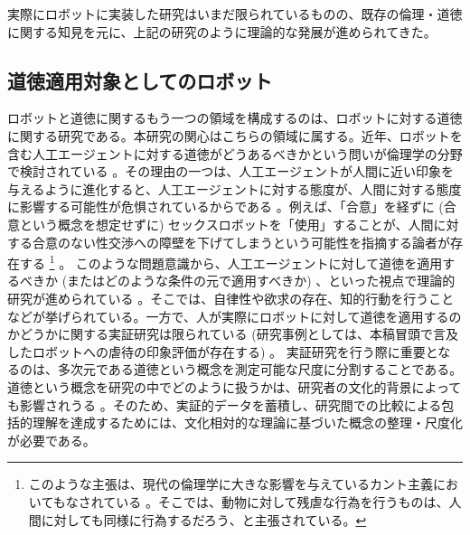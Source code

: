 \documentclass[a4j,12pt]{jreport}
\begin{document}
実際にロボットに実装した研究はいまだ限られているものの、既存の倫理・道徳に関する知見を元に、上記の研究のように理論的な発展が進められてきた。

\subsection{道徳適用対象としてのロボット}
ロボットと道徳に関するもう一つの領域を構成するのは、ロボットに対する道徳に関する研究である。本研究の関心はこちらの領域に属する。近年、ロボットを含む人工エージェントに対する道徳がどうあるべきかという問いが倫理学の分野で検討されている\cite{coeck, sex} 。その理由の一つは、人工エージェントが人間に近い印象を与えるように進化すると、人工エージェントに対する態度が、人間に対する態度に影響する可能性が危惧されているからである\cite{sex, Darling} 。例えば、「合意」を経ずに (合意という概念を想定せずに) セックスロボットを「使用」することが、人間に対する合意のない性交渉への障壁を下げてしまうという可能性を指摘する論者が存在する\cite{sex} \footnote{このような主張は、現代の倫理学に大きな影響を与えているカント主義においてもなされている\cite{Kant} 。そこでは、動物に対して残虐な行為を行うものは、人間に対しても同様に行為するだろう、と主張されている。} 。
このような問題意識から、人工エージェントに対して道徳を適用するべきか (またはどのような条件の元で適用すべきか) 、といった視点で理論的研究が進められている\cite{when} 。そこでは、自律性や欲求の存在、知的行動を行うことなどが挙げられている。一方で、人が実際にロボットに対して道徳を適用するのかどうかに関する実証研究は限られている (研究事例としては、本稿冒頭で言及したロボットへの虐待の印象評価\cite{abuse}が存在する) 。
実証研究を行う際に重要となるのは、多次元である道徳という概念を測定可能な尺度に分割することである。道徳という概念を研究の中でどのように扱うかは、研究者の文化的背景によっても影響されうる\cite{white} 。そのため、実証的データを蓄積し、研究間での比較による包括的理解を達成するためには、文化相対的な理論に基づいた概念の整理・尺度化が必要である。



\end{document}
